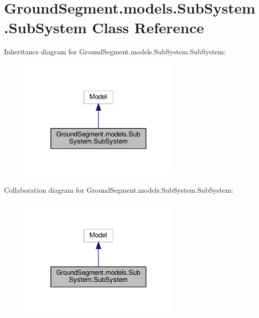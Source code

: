 \hypertarget{class_ground_segment_1_1models_1_1_sub_system_1_1_sub_system}{}\section{Ground\+Segment.\+models.\+Sub\+System.\+Sub\+System Class Reference}
\label{class_ground_segment_1_1models_1_1_sub_system_1_1_sub_system}


Inheritance diagram for Ground\+Segment.\+models.\+Sub\+System.\+Sub\+System\+:\nopagebreak
\begin{figure}[H]
\begin{center}
\leavevmode
\includegraphics[width=222pt]{class_ground_segment_1_1models_1_1_sub_system_1_1_sub_system__inherit__graph}
\end{center}
\end{figure}


Collaboration diagram for Ground\+Segment.\+models.\+Sub\+System.\+Sub\+System\+:\nopagebreak
\begin{figure}[H]
\begin{center}
\leavevmode
\includegraphics[width=222pt]{class_ground_segment_1_1models_1_1_sub_system_1_1_sub_system__coll__graph}
\end{center}
\end{figure}
